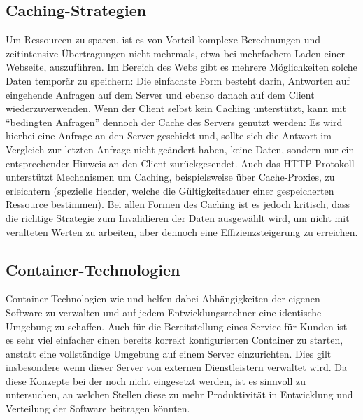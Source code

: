 \subsection{Caching-Strategien}
Um Ressourcen zu sparen, ist es von Vorteil komplexe Berechnungen und zeitintensive Übertragungen nicht mehrmals, etwa bei mehrfachem Laden einer Webseite, auszuführen. Im Bereich des Webs gibt es mehrere Möglichkeiten solche Daten temporär zu speichern: Die einfachste Form besteht darin, Antworten auf eingehende Anfragen auf dem Server und ebenso danach auf dem Client wiederzuverwenden. Wenn der Client selbst kein Caching unterstützt, kann mit \enquote{bedingten Anfragen} dennoch der Cache des Servers genutzt werden: Es wird hierbei eine Anfrage an den Server geschickt und, sollte sich die Antwort im Vergleich zur letzten Anfrage nicht geändert haben, keine Daten, sondern nur ein entsprechender Hinweis an den Client zurückgesendet. Auch das HTTP-Protokoll unterstützt Mechanismen um Caching, beispielsweise über Cache-Proxies, zu erleichtern (spezielle Header, welche die Gültigkeitsdauer einer gespeicherten Ressource bestimmen). Bei allen Formen des Caching ist es jedoch kritisch, dass die richtige Strategie zum Invalidieren der Daten ausgewählt wird, um nicht mit veralteten Werten zu arbeiten, aber dennoch eine Effizienzsteigerung zu erreichen.

\subsection{Container-Technologien}
Container-Technologien wie  und  helfen dabei Abhängigkeiten der eigenen Software zu verwalten und auf jedem Entwicklungsrechner eine identische Umgebung zu schaffen. Auch für die Bereitstellung eines Service für Kunden ist es sehr viel einfacher einen bereits korrekt konfigurierten Container zu starten, anstatt eine vollständige Umgebung auf einem Server einzurichten. Dies gilt insbesondere wenn dieser Server von externen Dienstleistern verwaltet wird. Da diese Konzepte bei der  noch nicht eingesetzt werden, ist es sinnvoll zu untersuchen, an welchen Stellen diese zu mehr Produktivität in Entwicklung und Verteilung der Software beitragen könnten.

